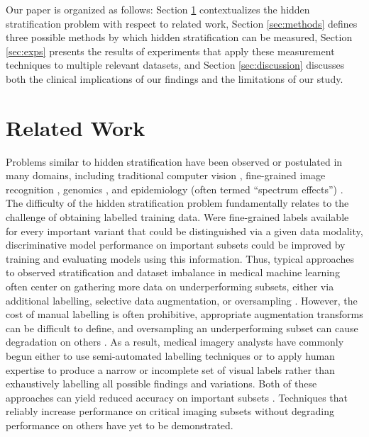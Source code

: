 \documentclass[sigconf,anonymous,review]{acmart}
\begin{document}
Our paper is organized as follows: Section \ref{sec:relwork} contextualizes the hidden stratification problem with respect to related work, Section \ref{sec:methods} defines three possible methods by which hidden stratification can be measured, Section \ref{sec:exps} presents the results of experiments that apply these measurement techniques to multiple relevant datasets, and Section \ref{sec:discussion} discusses both the clinical implications of our findings and the limitations of our study.

\section{Related Work}
\label{sec:relwork}

Problems similar to hidden stratification have been observed or postulated in many domains, including traditional computer vision \citep{recht2018cifar}, fine-grained image recognition \citep{yao2011combining}, genomics \citep{cardon2003population}, and epidemiology (often termed ``spectrum effects'') \citep{mulherin2002spectrum}.
The difficulty of the hidden stratification problem fundamentally relates to the challenge of obtaining labelled training data.  
Were fine-grained labels available for every important variant that could be distinguished via a given data modality, discriminative model performance on important subsets could be improved by training and evaluating models using this information.  
Thus, typical approaches to observed stratification and dataset imbalance in medical machine learning often center on gathering more data on underperforming subsets, either via additional labelling, selective data augmentation, or oversampling \citep{Mazurowski2008-cq}.  
However, the cost of manual labelling is often prohibitive, appropriate augmentation transforms can be difficult to define, and oversampling an underperforming subset can cause degradation on others \citep{Fries2019-ze, Ratner2017-td, Buda2018-ab, Zech2018-xq}.  
As a result, medical imagery analysts have commonly begun either to use semi-automated labelling techniques \citep{Wang2017-vm, Fries2019-ze, Irvin2019-ho, Dunnmon2019-zw} or to apply human expertise to produce a narrow or incomplete set of visual labels \citep{Rajpurkar2017-rc} rather than exhaustively labelling all possible findings and variations.
Both of these approaches can yield reduced accuracy on important subsets \citep{Oakden-Rayner2019-yi}.  
Techniques that reliably increase performance on critical imaging subsets without degrading performance on others have yet to be demonstrated.
 
\end{document}
